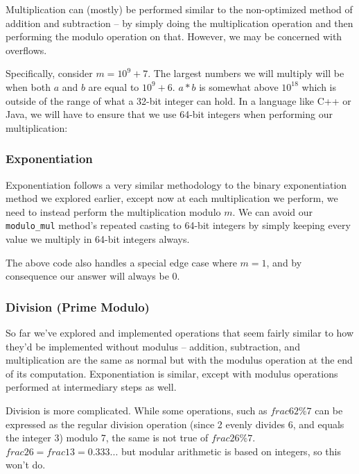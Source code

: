 Multiplication can (mostly) be performed similar to the non-optimized method of addition and subtraction -- by simply doing the multiplication operation and then performing the modulo operation on that. However, we may be concerned with overflows.

Specifically, consider $m = 10^9 + 7$. The largest numbers we will multiply will be when both $a$ and $b$ are equal to $10^9 + 6$. $a * b$ is somewhat above $10^{18}$ which is outside of the range of what a 32-bit integer can hold. In a language like C++ or Java, we will have to ensure that we use 64-bit integers when performing our multiplication:


\subsubsection{Exponentiation}

Exponentiation follows a very similar methodology to the binary exponentiation method we explored earlier, except now at each multiplication we perform, we need to instead perform the multiplication modulo $m$. We can avoid our \texttt{modulo_mul} method's repeated casting to 64-bit integers by simply keeping every value we multiply in 64-bit integers always.


The above code also handles a special edge case where $m = 1$, and by consequence our answer will always be $0$.

\subsubsection{Division (Prime Modulo)}

So far we've explored and implemented operations that seem fairly similar to how they'd be implemented without modulus -- addition, subtraction, and multiplication are the same as normal but with the modulus operation at the end of its computation. Exponentiation is similar, except with modulus operations performed at intermediary steps as well.

Division is more complicated. While some operations, such as $frac{6}{2} \% 7$ can be expressed as the regular division operation (since 2 evenly divides 6, and equals the integer 3) modulo 7, the same is not true of $frac{2}{6} \% 7$. $frac{2}{6} = frac{1}{3} = 0.333...$ but modular arithmetic is based on integers, so this won't do.

